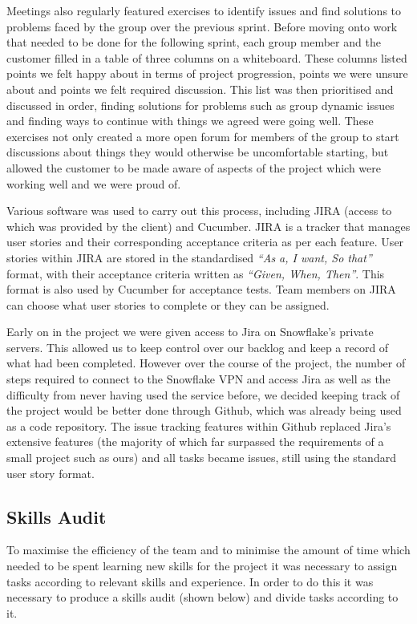 \documentclass[a4paper, 12pt]{article}
\begin{document}
Meetings also regularly featured exercises to identify issues and find solutions to problems faced by the group over the previous sprint. Before moving onto work that needed to be done for the following sprint, each group member and the customer filled in a table of three columns on a whiteboard. These columns listed points we felt happy about in terms of project progression, points we were unsure about and points we felt required discussion. This list was then prioritised and discussed in order, finding solutions for problems such as group dynamic issues and finding ways to continue with things we agreed were going well. These exercises not only created a more open forum for members of the group to start discussions about things they would otherwise be uncomfortable starting, but allowed the customer to be made aware of aspects of the project which were working well and we were proud of.

Various software was used to carry out this process, including JIRA (access to which was provided by the client) and Cucumber. JIRA is a tracker that manages user stories and their corresponding acceptance criteria as per each feature. User stories within JIRA are stored in the standardised \emph{``As a, I want, So that''} format, with their acceptance criteria written as \emph{``Given, When, Then''}. This format is also used by Cucumber for acceptance tests. Team members on JIRA can choose what user stories to complete or they can be assigned.

Early on in the project we were given access to Jira on Snowflake's private servers. This allowed us to keep control over our backlog and keep a record of what had been completed. However over the course of the project, the number of steps required to connect to the Snowflake VPN and access Jira as well as the difficulty from never having used the service before, we decided keeping track of the project would be better done through Github, which was already being used as a code repository. The issue tracking features within Github replaced Jira's extensive features (the majority of which far surpassed the requirements of a small project such as ours) and all tasks became issues, still using the standard user story format.

\subsection{Skills Audit}
To maximise the efficiency of the team and to minimise the amount of time which needed to be spent learning new skills for the project it was necessary to assign tasks according to relevant skills and experience. In order to do this it was necessary to produce a skills audit (shown below) and divide tasks according to it.
\end{document}

